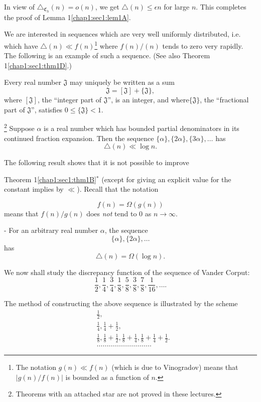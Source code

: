 In view of $\triangle_{\mathfrak{C}_{h}} (n) = o(n)$, we get $\triangle(n) \leq \epsilon n$ for large $n$. This completes the proof of Lemma 1\ref{chap1:sec1:lem1A}.

We are interested in sequences which are very well uniformly distributed, i.e. which have $\triangle(n) \ll f(n)$\footnote{The notation $g(n) \ll f(n)$ (which is due to Vinogradov) means that $|g(n)/f(n)|$ is bounded as a function of $n$.} where $f(n)/(n)$ tends to zero very rapidly. The following is an example of such a sequence. (See also Theorem 1\ref{chap1:sec1:thm1D}.)

Every real number $\mathfrak{J}$ may uniquely be written as a sum
$$
\mathfrak{J} = [\mathfrak{J}] + \{\mathfrak{J}\},
$$   
where $[\mathfrak{J}]$, the ``integer part of $\mathfrak{J}$'', is an integer, and where$\{\mathfrak{J}\}$, the ``fractional part of $\mathfrak{J}$'', satisfies $0 \leq \{\mathfrak{J}\} < 1$.

\begin{theorem}[$^{*}$]\label{chap1:sec1:thm1B}
  \footnote{Theorems with an attached star are not proved in these lectures.}
  \cite{12} Suppose $\alpha$ is a real number which has bounded partial denominators in its continued fraction expansion. Then the sequence $\{\alpha\}, \{2\alpha\}, \{3\alpha\}, \ldots$ has
  $$
  \triangle (n) \ll \log n.
  $$
\end{theorem}
The following result shows that it is not possible to improve

Theorem 1\ref{chap1:sec1:thm1B}${^*}$ (except for giving an explicit value for the constant implies by $\ll$). Recall that the notation

$$
f(n) = \Omega(g(n))
$$\pageoriginale
means that $f(n)/g(n)$ does {\em not} tend to $0$ as $n \to \infty$.

\begin{theorem}[$^{*}$]\label{chap1:sec1:thm1C}
 \cite{8}-\cite{16} For an arbitrary real number $\alpha$, the sequence
$$
\{\alpha\}, \{2\alpha\}, \ldots
$$
has
$$
\triangle(n) = \Omega (\log n).
$$
\end{theorem} 

We now shall study the discrepancy function of the sequence of Vander Corput:
$$
\dfrac{1}{2}, \dfrac{1}{4}, \dfrac{3}{4}, \dfrac{1}{8}, \dfrac{5}{8}, \dfrac{3}{8}, \dfrac{7}{8}, \dfrac{1}{16}, \ldots .
$$

The method of constructing the above sequence is illustrated by the scheme
\begin{align*}
& \frac{1}{2},\\
& \frac{1}{4}, \frac{1}{4} + \frac{1}{2},\\
& \frac{1}{8}, \frac{1}{8} + \frac{1}{2}, \frac{1}{8} + \frac{1}{4}, \frac{1}{8} + \frac{1}{4} + \frac{1}{2}.\\
&\ldots\ldots\ldots\ldots\ldots\ldots\ldots\ldots\ldots.
\end{align*}

